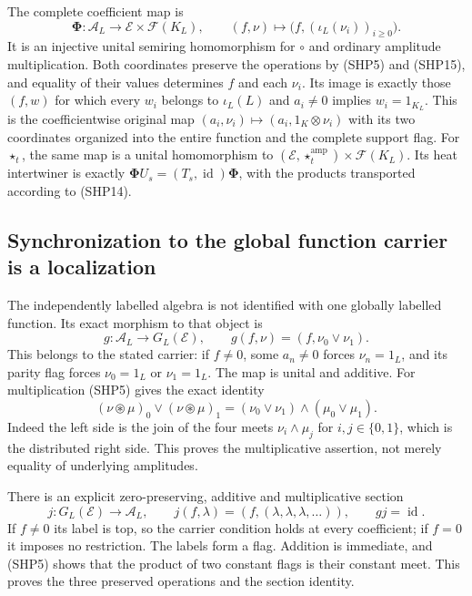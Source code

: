 The complete coefficient map is
\begin{equation}\tag{SHP16}
 \boldsymbol\Phi:\mathcal A_L
     \longrightarrow\mathcal E\times\mathcal F(K_L),
 \qquad(f,\nu)\longmapsto
                  \bigl(f,(\iota_L(\nu_i))_{i\ge0}\bigr).
\end{equation}
It is an injective unital semiring homomorphism for
$\circ$ and ordinary amplitude multiplication.
Both coordinates preserve the operations by (SHP5)
and (SHP15), and equality of their values determines
$f$ and each $\nu_i$. Its image is exactly those
$(f,w)$ for which every $w_i$ belongs to $\iota_L(L)$
and $a_i\ne0$ implies $w_i=1_{K_L}$.
This is the coefficientwise original map
$(a_i,\nu_i)\mapsto(a_i,1_K\otimes\nu_i)$ with its
two coordinates organized into the entire function
and the complete support flag.
For $\star_t$, the same map is a unital homomorphism
to $(\mathcal E,\star_t^{\mathrm{amp}})
\times\mathcal F(K_L)$.
Its heat intertwiner is exactly
$\boldsymbol\Phi U_s=(T_s,\operatorname{id})
\boldsymbol\Phi$, with the products transported
according to (SHP14).

\subsection{Synchronization to the global function carrier is a localization}

The independently labelled algebra is not identified
with one globally labelled function. Its exact morphism
to that object is
\begin{equation}\tag{SHP17}
 g:\mathcal A_L\longrightarrow G_L(\mathcal E),\qquad
 g(f,\nu)=(f,\nu_0\vee\nu_1).
\end{equation}
This belongs to the stated carrier: if $f\ne0$, some
$a_n\ne0$ forces $\nu_n=1_L$, and its parity flag
forces $\nu_0=1_L$ or $\nu_1=1_L$.
The map is unital and additive.
For multiplication (SHP5) gives the exact identity
\begin{equation}\tag{SHP18}
 (\nu\circledast\mu)_0\vee(\nu\circledast\mu)_1
   =(\nu_0\vee\nu_1)\wedge(\mu_0\vee\mu_1).
\end{equation}
Indeed the left side is the join of the four meets
$\nu_i\wedge\mu_j$ for $i,j\in\{0,1\}$, which is
the distributed right side. This proves the
multiplicative assertion, not merely equality of
underlying amplitudes.

There is an explicit zero-preserving, additive and
multiplicative section
\begin{equation}\tag{SHP19}
 j:G_L(\mathcal E)\longrightarrow\mathcal A_L,\qquad
 j(f,\lambda)=(f,(\lambda,\lambda,\lambda,\ldots)),\qquad
 gj=\operatorname{id}.
\end{equation}
If $f\ne0$ its label is top, so the carrier condition
holds at every coefficient; if $f=0$ it imposes
no restriction. The labels form a flag.
Addition is immediate, and (SHP5) shows that the
product of two constant flags is their constant meet.
This proves the three preserved operations and the
section identity.

